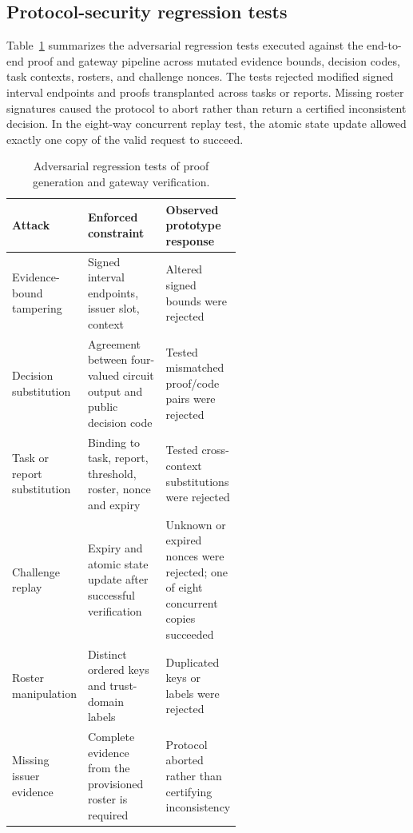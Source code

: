 \documentclass[pdflatex,iicol,sn-mathphys-num]{sn-jnl}
\theoremstyle{thmstyleone}
\begin{document}
\subsection{Protocol-security regression tests}
Table~\ref{tab:security-validation} summarizes the adversarial regression tests executed against the end-to-end proof and gateway pipeline across mutated evidence bounds, decision codes, task contexts, rosters, and challenge nonces. The tests rejected modified signed interval endpoints and proofs transplanted across tasks or reports. Missing roster signatures caused the protocol to abort rather than return a certified inconsistent decision. In the eight-way concurrent replay test, the atomic state update allowed exactly one copy of the valid request to succeed.

\begin{table}[t]\centering\small
\caption{Adversarial regression tests of proof generation and gateway verification.}\label{tab:security-validation}
\begin{tabularx}{\linewidth}{@{}p{0.22\linewidth}p{0.35\linewidth}X@{}}\toprule
Attack & Enforced constraint & Observed prototype response\\\midrule
Evidence-bound tampering & Signed interval endpoints, issuer slot, context & Altered signed bounds were rejected\\
Decision substitution & Agreement between four-valued circuit output and public decision code & Tested mismatched proof/code pairs were rejected\\
Task or report substitution & Binding to task, report, threshold, roster, nonce and expiry & Tested cross-context substitutions were rejected\\
Challenge replay & Expiry and atomic state update after successful verification & Unknown or expired nonces were rejected; one of eight concurrent copies succeeded\\
Roster manipulation & Distinct ordered keys and trust-domain labels & Duplicated keys or labels were rejected\\
Missing issuer evidence & Complete evidence from the provisioned roster is required & Protocol aborted rather than certifying inconsistency\\\bottomrule
\end{tabularx}\end{table}
\end{document}
